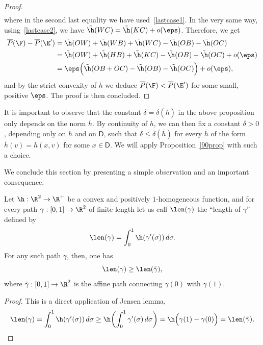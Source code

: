 \begin{proof}
\[\begin{split}
\end{split}\]
where in the second last equality we have used~\eqref{lastcase1}. In the very same way, using~\eqref{lastcase2}, we have $\tilde\h(WC)=\tilde\h(KC)+o(\eps)$. Therefore, we get
\[\begin{split}
\overline P(\F)-\overline P(\E') &= \tilde\h(OW)+\tilde\h(WB)+\tilde\h(WC)-\tilde\h(OB)-\tilde\h(OC)\\
&= \tilde\h(OW)+\tilde\h(HB)+\tilde\h(KC)-\tilde\h(OB)-\tilde\h(OC)+o(\eps)\\
&=\eps \Big(\tilde\h(OB+OC)-\tilde\h(OB)-\tilde\h(OC)\Big) + o(\eps),
\end{split}\]
and by the strict convexity of $\overline h$ we deduce $\overline P(\F)<\overline P(\E')$ for some small, positive $\eps$. The proof is then concluded.
\end{proof}

\begin{rmk}\label{fixdelta}
It is important to observe that the constant $\delta=\delta(\overline h)$ in the above proposition only depends on the norm $\overline h$. By continuity of $h$, we can then fix a constant $\delta>0$, depending only on $h$ and on $\mathsf{D}$, such that $\delta\leq \delta(\overline h)$ for every $\overline h$ of the form $\overline h(v)=h(x,v)$ for some $x\in \mathsf{D}$. We will apply Proposition~\ref{90prop} with such a choice.
\end{rmk}

We conclude this section by presenting a simple observation and an important consequence.

\begin{lem}\label{lemmagiorgio}
Let $\h:\R^2\to\R^+$ be a convex and positively $1$-homogeneous function, and for every path $\gamma:[0,1]\to\R^2$ of finite length let us call $\len(\gamma)$ the ``length of $\gamma$'' defined by
\begin{equation}\label{lengthcurves}
\len(\gamma) = \int_0^1 \h(\gamma'(\sigma))\,d\sigma.
\end{equation}
For any such path $\gamma$, then, one has
\[
\len(\gamma)\geq \len(\tilde\gamma),
\]
where $\tilde\gamma:[0,1]\to\R^2$ is the affine path connecting $\gamma(0)$ with $\gamma(1)$.
\end{lem}
\begin{proof}
This is a direct application of Jensen lemma,
\[
\len(\gamma) = \int_0^1 \h(\gamma'(\sigma))\,d\sigma
\geq \h\biggl(\int_0^1 \gamma'(\sigma)\,d\sigma\biggr)
= \h\Big(\gamma(1)-\gamma(0)\Big)
=\len(\tilde\gamma).\qedhere
\]
\end{proof}

